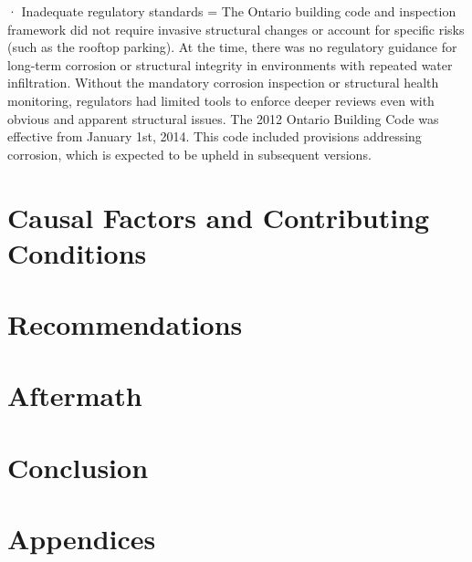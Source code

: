 \documentclass[12pt]{article}
\begin{document}
 

 · Inadequate regulatory standards = The Ontario building code and inspection framework did not require invasive structural changes or account for specific risks (such as the rooftop parking). At the time, there was no regulatory guidance for long-term corrosion or structural integrity in environments with repeated water infiltration. Without the mandatory corrosion inspection or structural health monitoring, regulators had limited tools to enforce deeper reviews even with obvious and apparent structural issues. The 2012 Ontario Building Code was effective from January 1st, 2014. This code included provisions addressing corrosion, which is expected to be upheld in subsequent versions. 


\section{Causal Factors and Contributing Conditions}



\section{Recommendations}



\section{Aftermath}

\section{Conclusion}


\section*{Appendices}

\newpage
\printbibliography
\end{document}
